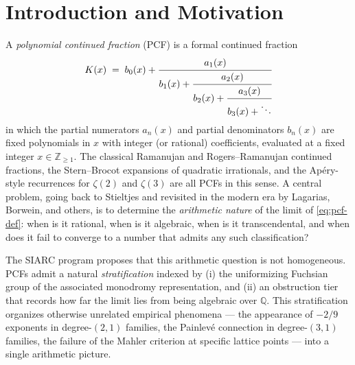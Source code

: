 \documentclass[11pt,a4paper]{article}
\theoremstyle{definition}
\theoremstyle{remark}
\newcommand{\Q}{\mathbb{Q}}
\newcommand{\Z}{\mathbb{Z}}
\begin{document}
\begin{abstract}
The v2.3 micro-bump (May 2026) extends the v2.2 amendment in two
narrow ways: (i) a \emph{sharper-bookkeeping pass} on the $d \geq 3$
caveat carried forward by the M8b V0 closure (Item~6 below), making
the caveat an explicit cross-reference to Open
Problem~\ref{prob:b4-allD} and adding a soft forward-pointer to the
in-preparation higher-Painlev\'e / Birkhoff--Trjitzinsky extension
program; and (ii) a \emph{picture-chain fold} (new Item~7 below)
recording the picture-chain v1.20+ governance-tier substrate
(bridge SHA \texttt{b9aa881}, cascade-132 PATH$_{\mathrm{B}}$
Option~$\alpha$ third realization) as the operator-runbook /
outlook companion to the umbrella v2.2 + PCF-2 v1.4 substrate-prep
fires. \emph{No mathematical content, conjecture, open problem, or
cross-degree triple of \S\ref{sec:triple} is modified by v2.3};
the v2.3 micro-bump is a sharper-bookkeeping + cross-document
propagation pass, not a content revision.
\end{abstract}

\tableofcontents

\section{Introduction and Motivation}
\label{sec:intro}

A \emph{polynomial continued fraction} (PCF) is a formal continued fraction
\begin{equation}
  \label{eq:pcf-def}
  K(x) \;=\; b_0(x) + \cfrac{a_1(x)}{b_1(x) + \cfrac{a_2(x)}{b_2(x) + \cfrac{a_3(x)}{b_3(x) + \ddots}}}
\end{equation}
in which the partial numerators $a_n(x)$ and partial denominators $b_n(x)$
are fixed polynomials in $x$ with integer (or rational) coefficients, evaluated
at a fixed integer $x \in \Z_{\geq 1}$. The classical Ramanujan and
Rogers--Ramanujan continued fractions, the Stern--Brocot expansions of
quadratic irrationals, and the Apéry-style recurrences for $\zeta(2)$ and
$\zeta(3)$ are all PCFs in this sense. A central problem, going back to
Stieltjes and revisited in the modern era by Lagarias, Borwein, and others,
is to determine the \emph{arithmetic nature} of the limit of \eqref{eq:pcf-def}:
when is it rational, when is it algebraic, when is it transcendental, and
when does it fail to converge to a number that admits any such classification?

The SIARC program proposes that this arithmetic question is not
homogeneous. PCFs admit a natural \emph{stratification} indexed by
(i) the uniformizing Fuchsian group of the associated monodromy
representation, and (ii) an obstruction tier that records how far the
limit lies from being algebraic over $\Q$. This stratification organizes
otherwise unrelated empirical phenomena --- the appearance of $-2/9$
exponents in degree-$(2,1)$ families, the Painlevé connection in
degree-$(3,1)$ families, the failure of the Mahler criterion at
specific lattice points --- into a single arithmetic picture.
\end{document}

